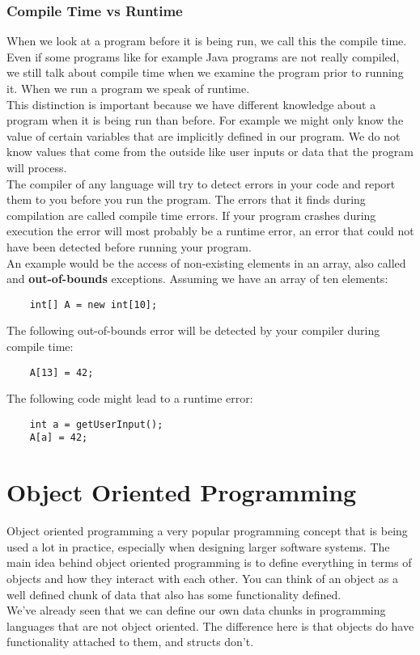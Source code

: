 \documentclass{scrreprt}
\begin{document}
\subsection{Compile Time vs Runtime}
When we look at a program before it is being run, we call this the compile time. Even if some programs like for example Java programs are not really compiled, we still talk about compile time when we examine the program prior to running it. When we run a program we speak of runtime. \\
This distinction is important because we have different knowledge about a program when it is being run than before. For example we might only know the value of certain variables that are implicitly defined in our program. We do not know values that come from the outside like user inputs or data that the program will process. \\
The compiler of any language will try to detect errors in your code and report them to you before you run the program. The errors that it finds during compilation are called compile time errors. If your program crashes during execution the error will most probably be a runtime error, an error that could not have been detected before running your program. \\
An example would be the access of non-existing elements in an array, also called and \textbf{out-of-bounds} exceptions. Assuming we have an array of ten elements:
\begin{lstlisting}
	int[] A = new int[10];
\end{lstlisting}
The following out-of-bounds error will be detected by your compiler during compile time:
\begin{lstlisting}
	A[13] = 42;
\end{lstlisting}
The following code might lead to a runtime error:
\begin{lstlisting}
	int a = getUserInput();
	A[a] = 42;
\end{lstlisting}


\chapter{Object Oriented Programming}
Object oriented programming a very popular programming concept that is being used a lot in practice, especially when designing larger software systems.
The main idea behind object oriented programming is to define everything in terms of objects and how they interact with each other. You can think of an object as a well defined chunk of data that also has some functionality defined. \\
We've already seen that we can define our own data chunks in programming languages that are not object oriented. The difference here is that objects do have functionality attached to them, and structs don't. \\
\end{document}
